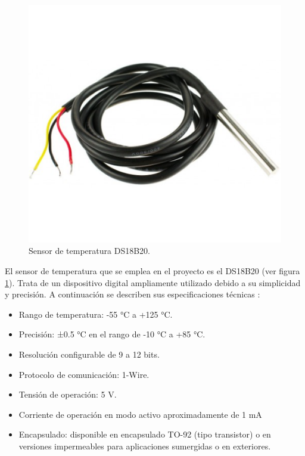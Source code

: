 \begin{figure}[H]
	\centering
	\includegraphics[scale=1]{./Figures/Hardware/Sensores/sensortemperatura.png}
	\caption{Sensor de temperatura DS18B20.}
	\label{fig:SensorTemperatura}
\end{figure}

\label{sec:SensorTemperatura}
El sensor de temperatura que se emplea en el proyecto es el DS18B20 (ver figura \ref{fig:SensorTemperatura}). Trata de un dispositivo digital  ampliamente utilizado debido a su simplicidad y precisión. A continuación se describen sus especificaciones técnicas \citep{Sensor_temp}:

\begin{itemize}
    \item Rango de temperatura: -55 °C a +125 °C.
    \item Precisión: ±0.5 °C en el rango de -10 °C a +85 °C.
    \item Resolución configurable de 9 a 12 bits.
    \item Protocolo de comunicación: 1-Wire.
    \item Tensión de operación: 5 V.
    \item Corriente de operación en modo activo aproximadamente de 1 mA
    \item Encapsulado: disponible en encapsulado TO-92 (tipo transistor) o en versiones impermeables para aplicaciones sumergidas o en exteriores.
\end{itemize}

